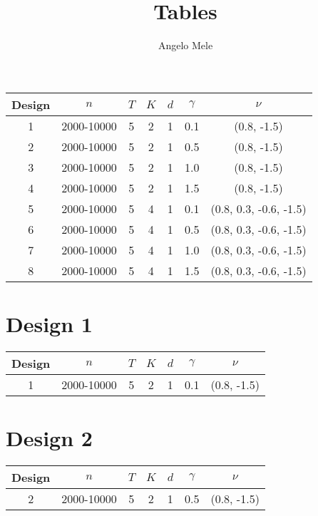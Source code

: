 \documentclass[11pt,letterpaper]{article}
\author{Angelo Mele}
\title{Tables }
\begin{document}
\maketitle

\begin{table}
\begin{tabular}{ccccccc}
\hline\hline
Design & $n$          & $T$ & $K$ & $d$ & $\gamma$ & $\nu$ \\
\hline
1      & 2000-10000   & 5   & 2   & 1   & 0.1      & (0.8, -1.5) \\
2      & 2000-10000   & 5   & 2   & 1   & 0.5      & (0.8, -1.5)\\
3      & 2000-10000   & 5   & 2   & 1   & 1.0      & (0.8, -1.5)\\
4      & 2000-10000   & 5   & 2   & 1   & 1.5      & (0.8, -1.5)\\
5      & 2000-10000   & 5   & 4   & 1   & 0.1      & (0.8, 0.3, -0.6, -1.5)\\
6      & 2000-10000   & 5   & 4   & 1   & 0.5      & (0.8, 0.3, -0.6, -1.5)\\
7      & 2000-10000   & 5   & 4   & 1   & 1.0      & (0.8, 0.3, -0.6, -1.5)\\
8      & 2000-10000   & 5   & 4   & 1   & 1.5      & (0.8, 0.3, -0.6, -1.5)\\
\hline\hline
\end{tabular}
\end{table}


\section{Design 1}
\begin{table}
\begin{tabular}{ccccccc}
\hline\hline
Design & $n$          & $T$ & $K$ & $d$ & $\gamma$ & $\nu$ \\
\hline
1      & 2000-10000   & 5   & 2   & 1   & 0.1      & (0.8, -1.5) \\
\hline\hline
\end{tabular}
\end{table}




\section{Design 2}

\begin{table}
\begin{tabular}{ccccccc}
\hline\hline
Design & $n$          & $T$ & $K$ & $d$ & $\gamma$ & $\nu$ \\
\hline
2      & 2000-10000   & 5   & 2   & 1   & 0.5      & (0.8, -1.5)\\
\hline\hline
\end{tabular}
\end{table}

\end{document}
